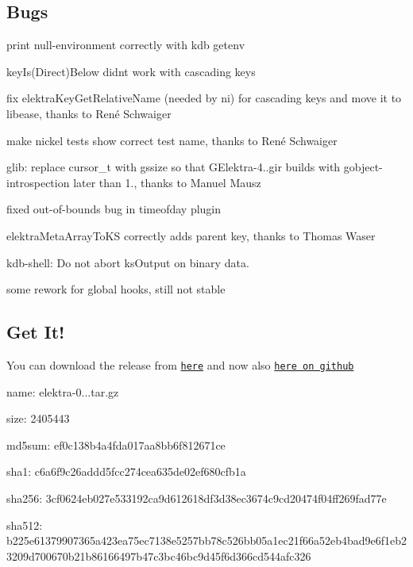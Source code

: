 \subsection*{Bugs}


\begin{DoxyItemize}
\item print null-\/environment correctly with {\ttfamily kdb getenv}
\item key\+Is(\+Direct)Below didn\textquotesingle{}t work with cascading keys
\item fix elektra\+Key\+Get\+Relative\+Name (needed by ni) for cascading keys and move it to libease, thanks to René Schwaiger
\item make nickel tests show correct test name, thanks to René Schwaiger
\item glib\+: replace cursor\+\_\+t with gssize so that G\+Elektra-\/4..\+gir builds with gobject-\/introspection later than 1., thanks to Manuel Mausz
\item fixed out-\/of-\/bounds bug in timeofday plugin
\item elektra\+Meta\+Array\+To\+KS correctly adds parent key, thanks to Thomas Waser
\item kdb-\/shell\+: Do not abort ks\+Output on binary data.
\item some rework for global hooks, still not stable
\end{DoxyItemize}

\subsection*{Get It!}

You can download the release from \href{https://www.libelektra.org/ftp/elektra/releases/elektra-0.8.16.tar.gz}{\tt here} and now also \href{https://github.com/ElektraInitiative/ftp/tree/master/releases/elektra-0.8.16.tar.gz}{\tt here on github}


\begin{DoxyItemize}
\item name\+: elektra-\/0...\+tar.\+gz
\item size\+: 2405443
\item md5sum\+: ef0c138b4a4fda017aa8bb6f812671ce
\item sha1\+: c6a6f9c26addd5fcc274cea635de02ef680cfb1a
\item sha256\+: 3cf0624eb027e533192ca9d612618df3d38ec3674c9cd20474f04ff269fad77e
\item sha512\+: b225e61379907365a423ea75ec7138e5257bb78c526bb05a1ec21f66a52eb4bad9e6f1eb23209d700670b21b86166497b47c3bc46bc9d45f6d366cd544afc326
\end{DoxyItemize}

